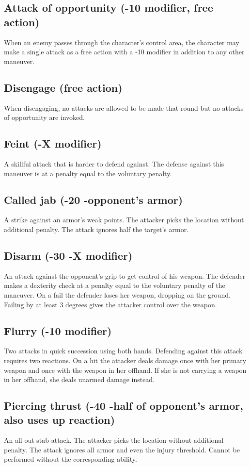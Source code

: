 \documentclass[12pt,a4paper]{book}
\begin{document}
	\subsection*{Attack of opportunity (-10 modifier, free action)}
	When an enemy passes through the character’s control area, the character may make a single attack as a free action with a -10 modifier in addition to any other maneuver.
	\subsection*{Disengage (free action)}
	When disengaging, no attacks are allowed to be made that round but no attacks of opportunity are invoked.
	\subsection*{Feint (-X modifier)}
	A skillful attack that is harder to defend against. The defense against this maneuver is at a penalty equal to the voluntary penalty.
	\subsection*{Called jab (-20 -opponent’s armor)}
	A strike against an armor’s weak points. The attacker picks the location without additional penalty. The attack ignores half the target’s armor.
	\subsection*{Disarm (-30 -X modifier)}
	An attack against the opponent’s grip to get control of his weapon. The defender makes a dexterity check at a penalty equal to the voluntary penalty of the maneuver. On a fail the defender loses her weapon, dropping on the ground. Failing by at least 3 degrees gives the attacker control over the weapon.
	\subsection*{Flurry (-10 modifier)}
	Two attacks in quick succession using both hands. Defending against this attack requires two reactions. On a hit the attacker deals damage once with her primary weapon and once with the weapon in her offhand. If she is not carrying a weapon in her offhand, she deals unarmed damage instead. 
	\subsection*{Piercing thrust (-40 -half of opponent’s armor, also uses up reaction)}
	An all-out stab attack. The attacker picks the location without additional penalty. The attack ignores all armor and even the injury threshold. Cannot be performed without the corresponding ability.
\end{document}
